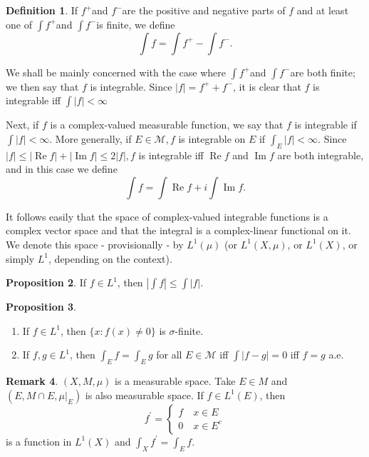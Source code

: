 \documentclass[12pt,a4paper]{book}
\newcommand{\p}{^{\prime}}
\newenvironment{enu}{\begin{enumerate}[(1)]}{\end{enumerate}}
\theoremstyle{definition}
\newtheorem{defn}{Definition}[section]
\newtheorem{rema}[defn]{Remark}
\newtheorem{prop}[defn]{Proposition}
\begin{document}
\begin{defn}
    If $f^{+}$and $f^{-}$are the positive and negative parts of $f$ and at least one of $\int f^{+}$and $\int f^{-}$is finite, we define
    $$
        \int f=\int f^{+}-\int f^{-} .
    $$

    We shall be mainly concerned with the case where $\int f^{+}$and $\int f^{-}$are both finite; we then say that $f$ is integrable. Since $|f|=f^{+}+f^{-}$, it is clear that $f$ is integrable iff $\int|f|<\infty$

    Next, if $f$ is a complex-valued measurable function, we say that $f$ is integrable if $\int|f|<\infty$. More generally, if $E \in \mathcal{M}, f$ is integrable on $E$ if $\int_E|f|<\infty$. Since $|f| \leq|\operatorname{Re} f|+|\operatorname{Im} f| \leq 2|f|, f$ is integrable iff $\operatorname{Re} f$ and $\operatorname{Im} f$ are both integrable, and in this case we define
    $$
        \int f=\int \operatorname{Re} f+i \int \operatorname{Im} f .
    $$

    It follows easily that the space of complex-valued integrable functions is a complex vector space and that the integral is a complex-linear functional on it. We denote this space - provisionally - by $L^1(\mu)$ (or $L^1(X, \mu)$, or $L^1(X)$, or simply $L^1$, depending on the context).
\end{defn}
\begin{prop}
    If $f \in L^1$, then $\left|\int f\right| \leq \int|f|$.
\end{prop}
\begin{prop}
    \begin{enu}
        \item If $f \in L^1$, then $\{x: f(x) \neq 0\}$ is $\sigma$-finite.
        \item If $f, g \in L^1$, then $\int_E f=\int_E g$ for all $E \in \mathcal{M}$ iff $\int|f-g|=0$ iff $f=g$ a.e.
    \end{enu}
\end{prop}
\begin{rema}
    $(X,M,\mu)$ is a measurable space. Take $E\in M$ and $(E,M\cap E, \mu|_E)$ is also measurable space. If $f\in L^1(E)$, then
    \begin{equation*}
        f\p=\begin{cases}
            f  \quad x\in E \\
            0 \quad x\in E^c
        \end{cases}
    \end{equation*}
    is a function in $L^1(X)$ and $\int_X f\p=\int_E f$.
\end{rema}
\end{document}
